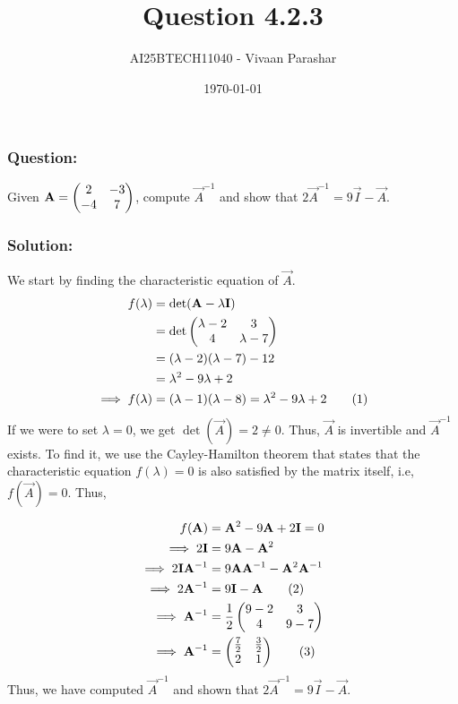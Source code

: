 \documentclass{beamer}
\title{Question 4.2.3}
\author{AI25BTECH11040 - Vivaan Parashar}
\date{\today}
\newcommand\numberthis{\addtocounter{equation}{1}\tag{\theequation}}
\begin{document}
\frame{\titlepage}

\begin{frame}
    \frametitle{Question: }
    Given $\mathbf{A} = \begin{pmatrix}2 & -3 \\ -4 & 7\end{pmatrix}$, compute $\vec{A}^{-1}$ and show that $2\vec{A}^{-1} = 9\vec{I} - \vec{A}$.
\end{frame}

\begin{frame}
    \frametitle{Solution: }
    We start by finding the characteristic equation of $\vec{A}$.
    \begin{align*}
        f(\lambda)          & = \det(\vec{A} - \lambda \vec{I})                                       \\
                            & = \det\myvec{\lambda - 2                                            & 3 \\ 4 & \lambda - 7} \\
                            & = (\lambda - 2)(\lambda - 7) - 12                                       \\
                            & = \lambda^2 - 9\lambda + 2                                              \\
        \implies f(\lambda) & = (\lambda - 1)(\lambda - 8) = \lambda^2 - 9\lambda + 2 \numberthis
    \end{align*}
    If we were to set $\lambda = 0$, we get $\det(\vec{A}) = 2 \ne 0$. Thus, $\vec{A}$ is invertible and $\vec{A}^{-1}$ exists. To find it, we use the Cayley-Hamilton theorem that states that the characteristic equation $f(\lambda) = 0$ is also satisfied by the matrix itself, i.e, $f(\vec{A}) = 0$. Thus,
\end{frame}
\begin{frame}
    \begin{align*}
        f(\vec{A})                    & = \vec{A}^2 - 9\vec{A} + 2\vec{I} = 0                        \\
        \implies 2\vec{I}             & = 9\vec{A} - \vec{A}^2                                       \\
        \implies 2\vec{I}\vec{A}^{-1} & = 9\vec{A}\vec{A}^{-1} - \vec{A}^2\vec{A}^{-1}               \\
        \implies 2\vec{A}^{-1}        & = 9\vec{I} - \vec{A}       \numberthis                       \\
        \implies \vec{A}^{-1}         & = \frac{1}{2}\myvec{9 - 2                      & 3           \\ 4 & 9 - 7} \\
        \implies \vec{A}^{-1}         & = \myvec{\frac{7}{2}                           & \frac{3}{2} \\ 2 & 1} \numberthis
    \end{align*}
    Thus, we have computed $\vec{A}^{-1}$ and shown that $2\vec{A}^{-1} = 9\vec{I} - \vec{A}$.
\end{frame}
\end{document}
